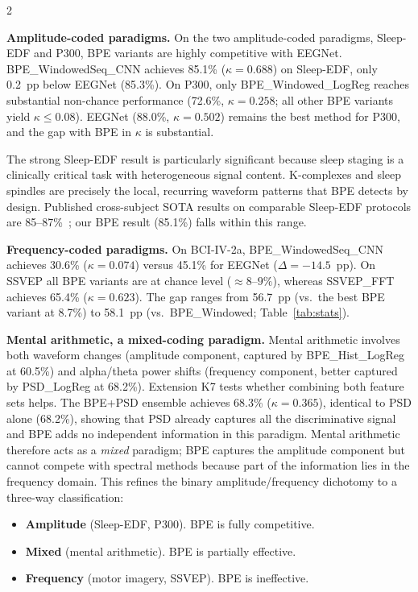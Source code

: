 \documentclass[14pt,a4paper]{extarticle}
\begin{document}
\begin{multicols}{2}

\textbf{Amplitude-coded paradigms.}
On the two amplitude-coded paradigms, Sleep-EDF and P300,
BPE variants are highly competitive with EEGNet.
BPE\_WindowedSeq\_CNN achieves 85.1\% ($\kappa{=}0.688$)
on Sleep-EDF, only 0.2~pp below EEGNet (85.3\%).
On P300, only BPE\_Windowed\_LogReg reaches substantial
non-chance performance
(72.6\%, $\kappa{=}0.258$; all other BPE variants
yield $\kappa{\leq}0.08$).
EEGNet (88.0\%, $\kappa{=}0.502$) remains the best method
for P300, and the gap with BPE in $\kappa$ is substantial.

The strong Sleep-EDF result is particularly significant because
sleep staging is a clinically critical task with
heterogeneous signal content.
K-complexes and sleep spindles
are precisely the local, recurring waveform patterns
that BPE detects by design.
Published cross-subject SOTA results on comparable
Sleep-EDF protocols are 85--87\%~\cite{phan2022xsleepnet,perslev2021usleep};
our BPE result (85.1\%) falls within this range.

\textbf{Frequency-coded paradigms.}
On BCI-IV-2a, BPE\-\_Win\-dowed\-Seq\-\_CNN achieves 30.6\%
($\kappa{=}0.074$) versus 45.1\% for EEGNet ($\Delta{=}{-14.5}$~pp).
On SSVEP all BPE variants are at chance level
($\approx 8$--$9\%$), whereas SSVEP\_FFT achieves 65.4\%
($\kappa{=}0.623$).
The gap ranges from 56.7~pp (vs.\ the best BPE variant at 8.7\%)
to 58.1~pp (vs.\ BPE\_Windowed; Table~\ref{tab:stats}).

\textbf{Mental arithmetic, a mixed-coding paradigm.}
Mental arithmetic involves both waveform changes (amplitude
component, captured by BPE\_Hist\_LogReg at 60.5\%) and alpha/theta
power shifts (frequency component, better captured by
PSD\_LogReg at 68.2\%).
Extension K7 tests whether combining both feature sets helps.
The BPE+PSD ensemble achieves 68.3\% ($\kappa{=}0.365$),
identical to PSD alone (68.2\%), showing that PSD already
captures all the discriminative signal and BPE adds no
independent information in this paradigm.
Mental arithmetic therefore acts as a \emph{mixed} paradigm;
BPE captures the amplitude component but cannot compete with
spectral methods because part of the information lies
in the frequency domain.
This refines the binary amplitude/frequency dichotomy
to a three-way classification:
\begin{itemize}[leftmargin=*,itemsep=1pt]
  \item \textbf{Amplitude} (Sleep-EDF, P300). BPE is fully competitive.
  \item \textbf{Mixed} (mental arithmetic). BPE is partially effective.
  \item \textbf{Frequency} (motor imagery, SSVEP). BPE is ineffective.
\end{itemize}


\end{multicols}
\end{document}
